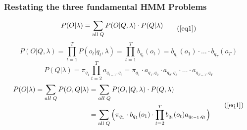 \documentclass{beamer}
\begin{document}
\begin{frame}
  \frametitle{Restating the three fundamental HMM Problems}
  \begin{equation}
    \begin{split}
      P(O \vert \lambda) = \displaystyle\sum_{\text{all}\;Q} P(O \vert
      Q, \lambda) \cdot P(Q \vert \lambda)
    \end{split}
    \tag{\ref{eq1}}
  \end{equation}
  \pause \vspace*{.em}
  \begin{equation}
    P(O \vert Q, \lambda) = \displaystyle\prod_{t=1}^{T} P(o_t \vert
    q_t, \lambda)= \displaystyle\prod_{t=1}^{T} b_{q_t}(o_t) =
    b_{q_1}(o_1) \cdot \ldots \cdot b_{q_T}(o_T)
    \label{eq:pql}
  \end{equation}\pause
  \vspace*{.em}
  \begin{equation}
    P(Q | \lambda) = \pi_{q_1}\displaystyle\prod_{t=2}^{T}
    a_{q_{t-1},q_t} = \pi_{q_1} \cdot a_{q_1,q_2} \cdot a_{q_2,q_3} \cdot \ldots \cdot
    a_{q_{T-1},q_T}\label{eq:pql2}
  \end{equation}\pause
  \vspace*{.em}
  \begin{equation}
    \begin{split}
      P(O \vert \lambda) = \displaystyle\sum_{all\;Q} P(O, Q \vert
      \lambda) & = \displaystyle\sum_{all\;Q} P(O,\vert Q, \lambda)
      \cdot P(Q, \lambda) \\
      & = \displaystyle\sum_{\text{all}\;Q} \Big( \pi_{q_1} \cdot
      b_{q_1}(o_1) \cdot \displaystyle\prod_{t=2}^{T} b_{q_t}(o_t)
      a_{q_{t-1},q_t} \Big)
    \end{split}
    \tag{\ref{eq1}}
  \end{equation}
\end{frame}
\end{document}
